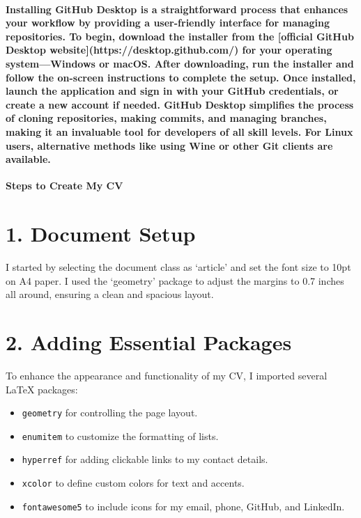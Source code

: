 \documentclass[12pt, a4paper]{article}
\begin{document}
\paragraph{Installing GitHub Desktop is a straightforward process that enhances your workflow by providing a user-friendly interface for managing repositories. To begin, download the installer from the [official GitHub Desktop website](https://desktop.github.com/) for your operating system—Windows or macOS. After downloading, run the installer and follow the on-screen instructions to complete the setup. Once installed, launch the application and sign in with your GitHub credentials, or create a new account if needed. GitHub Desktop simplifies the process of cloning repositories, making commits, and managing branches, making it an invaluable tool for developers of all skill levels. For Linux users, alternative methods like using Wine or other Git clients are available.}
\newpage
{}%
\vspace{-1cm}
\begin{center}
    {\Huge \textbf{Steps to Create My CV}} \\[1em]
\end{center}
\section*{1. Document Setup}
I started by selecting the document class as ‘article’ and set the font size to 10pt on A4 paper. I used the ‘geometry’ package to adjust the margins to 0.7 inches all around, ensuring a clean and spacious layout.

\section*{2. Adding Essential Packages}
To enhance the appearance and functionality of my CV, I imported several LaTeX packages:
\begin{itemize}[label=\textbullet, left=0pt]
    \item \texttt{geometry} for controlling the page layout.
    \item \texttt{enumitem} to customize the formatting of lists.
    \item \texttt{hyperref} for adding clickable links to my contact details.
    \item \texttt{xcolor} to define custom colors for text and accents.
    \item \texttt{fontawesome5} to include icons for my email, phone, GitHub, and LinkedIn.
\end{itemize}
\end{document}
